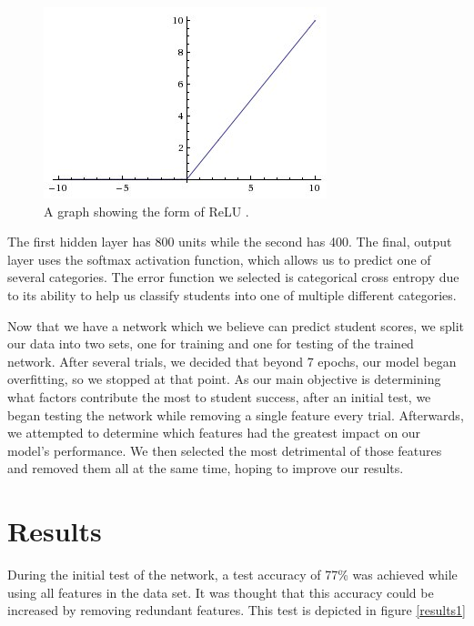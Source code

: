 \documentclass[conference]{IEEEtran}
\begin{document}
\begin{figure}[htbp]
\centerline{\includegraphics[width=\linewidth]{relu.jpg}}
\caption{A graph showing the form of ReLU \cite{kaggle}.}
\label{relu}
\end{figure}

The first hidden layer has 800 units while the second has 400. The final, output layer uses the softmax activation function, which allows us to predict one of several categories. The error function we selected is categorical cross entropy due to its ability to help us classify students into one of multiple different categories. 

Now that we have a network which we believe can predict student scores, we split our data into two sets, one for training and one for testing of the trained network. After several trials, we decided that beyond 7 epochs, our model began overfitting, so we stopped at that point. As our main objective is determining what factors contribute the most to student success, after an initial test, we began testing the network while removing a single feature every trial. Afterwards, we attempted to determine which features had the greatest impact on our model’s performance. We then selected the most detrimental of those features and removed them all at the same time, hoping to improve our results.

\section{Results}

During the initial test of the network, a test accuracy of 77\% was achieved while using all features in the data set. It was thought that this accuracy could be increased by removing redundant features. This test is depicted in figure \ref{results1}
\end{document}
